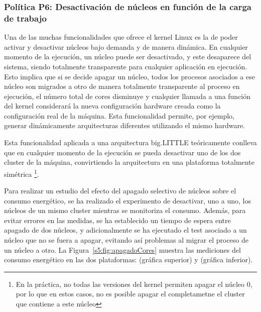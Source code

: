 \subsubsection{Política P6: Desactivación de núcleos en función de la carga
de trabajo}
\label{sec:p6}

Una de las muchas funcionalidades que ofrece el kernel Linux es la de poder
activar y desactivar núcleos bajo demanda y de manera dinámica. En
cualquier momento de la ejecución, un núcleo puede ser desactivado, y este
desaparece del sistema, siendo totalmente transparente para cualquier
aplicación en ejecución. Esto implica que si se decide apagar un núcleo,
todos los procesos asociados a ese núcleo son migrados a otro de manera
totalmente transparente al proceso en ejecución, el número total de cores
disminuye y cualquier llamada a una función del kernel considerará la nueva
configuración hardware creada como la configuración real de la
máquina. Esta funcionalidad permite, por ejemplo, generar dinámicamente
arquitecturas diferentes utilizando el mismo hardware.

Esta funcionalidad aplicada a una arquitectura big.LITTLE teóricamente
conlleva que en cualquier momento de la ejecución se pueda desactivar uno
de los dos cluster de la máquina, convirtiendo la arquitectura en una
plataforma totalmente simétrica \footnote{En la práctica, no todas las
  versiones del kernel permiten apagar el núcleo 0, por lo que en estos
  casos, no es posible apagar el completametne el cluster que contiene a
  este núcleo}.

Para realizar un estudio del efecto del apagado selectivo de núcleos sobre
el consumo energético, se ha realizado el experimento de desactivar, uno a
uno, los núcleos de un mismo cluster mientras se monitoriza el
consumo. Además, para evitar errores en las medidas, se ha establecido un
tiempo de espera entre apagado de dos núcleos, y adicionalmente se ha
ejecutado el test asociado a un núcleo que no se fuera a apagar, evitando
así problemas al migrar el proceso de un núcleo a otro. La
Figura~\ref{s5:fig:apagadoCores} muestra las mediciones del consumo
energético en las dos plataformas: \juno (gráfica superior) y \odroid
(gráfica inferior).

